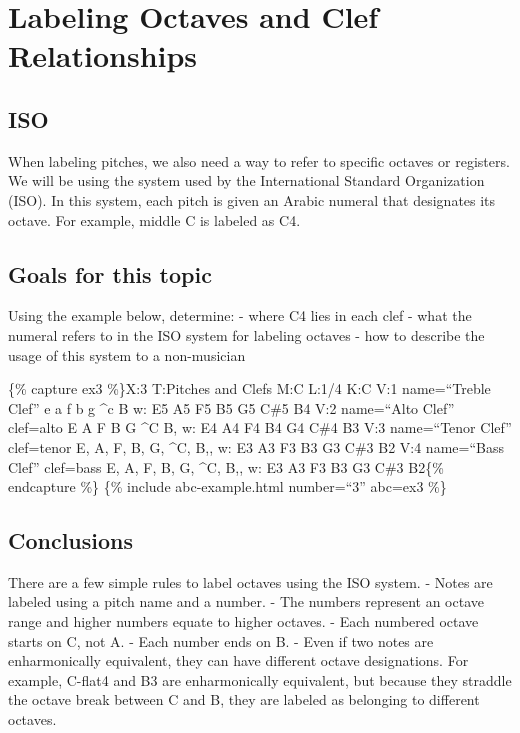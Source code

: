 \documentclass{book}
\begin{document}
\hypertarget{labeling-octaves-and-clef-relationships}{%
\section{\texorpdfstring{\textbf{Labeling Octaves and Clef
Relationships}}{Labeling Octaves and Clef Relationships}}\label{labeling-octaves-and-clef-relationships}}

\hypertarget{iso}{%
\subsection{ISO}\label{iso}}

When labeling pitches, we also need a way to refer to specific octaves or
registers. We will be using the system used by the International Standard
Organization (ISO). In this system, each pitch is given an Arabic numeral that
designates its octave. For example, middle C is labeled as C4.

\hypertarget{goals-for-this-topic-9}{%
\subsection{Goals for this topic}\label{goals-for-this-topic-9}}

Using the example below, determine: - where C4 lies in each clef - what the
numeral refers to in the ISO system for labeling octaves - how to describe the
usage of this system to a non-musician

\{\% capture ex3 \%\}X:3 T:Pitches and Clefs M:C L:1/4 K:C V:1 name=``Treble
Clef'' e a f b g \^{}c B\textbar{]} w: E5 A5 F5 B5 G5 C\#5 B4 V:2 name=``Alto
Clef'' clef=alto E A F B G \^{}C B,\textbar{]} w: E4 A4 F4 B4 G4 C\#4 B3 V:3
name=``Tenor Clef'' clef=tenor E, A, F, B, G, \^{}C, B,,\textbar{]} w: E3 A3
F3 B3 G3 C\#3 B2 V:4 name=``Bass Clef'' clef=bass E, A, F, B, G, \^{}C,
B,,\textbar{]} w: E3 A3 F3 B3 G3 C\#3 B2\{\% endcapture \%\} \{\% include
abc-example.html number=``3'' abc=ex3 \%\}

\hypertarget{conclusions-36}{%
\subsection{Conclusions}\label{conclusions-36}}

There are a few simple rules to label octaves using the ISO system. - Notes
are labeled using a pitch name and a number. - The numbers represent an octave
range and higher numbers equate to higher octaves. - Each numbered octave
starts on C, not A. - Each number ends on B. - Even if two notes are
enharmonically equivalent, they can have different octave designations. For
example, C-flat4 and B3 are enharmonically equivalent, but because they
straddle the octave break between C and B, they are labeled as belonging to
different octaves.
\end{document}
